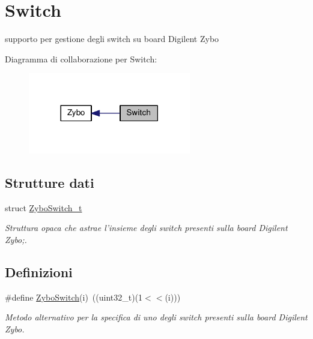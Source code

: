 \hypertarget{group___switch}{\section{Switch}
\label{group___switch}
}


supporto per gestione degli switch su board Digilent Zybo  


Diagramma di collaborazione per Switch\+:\nopagebreak
\begin{figure}[H]
\begin{center}
\leavevmode
\includegraphics[width=201pt]{group___switch}
\end{center}
\end{figure}
\subsection*{Strutture dati}
\begin{DoxyCompactItemize}
\item 
struct \hyperlink{struct_zybo_switch__t}{Zybo\+Switch\+\_\+t}
\begin{DoxyCompactList}\small\item\em Struttura opaca che astrae l'insieme degli switch presenti sulla board Digilent Zybo;. \end{DoxyCompactList}\end{DoxyCompactItemize}
\subsection*{Definizioni}
\begin{DoxyCompactItemize}
\item 
\#define \hyperlink{group___switch_ga1c463f6e1e3a43f68109c176772ce5cc}{Zybo\+Switch}(i)~((uint32\+\_\+t)(1$<$$<$(i)))
\begin{DoxyCompactList}\small\item\em Metodo alternativo per la specifica di uno degli switch presenti sulla board Digilent Zybo. \end{DoxyCompactList}\end{DoxyCompactItemize}
